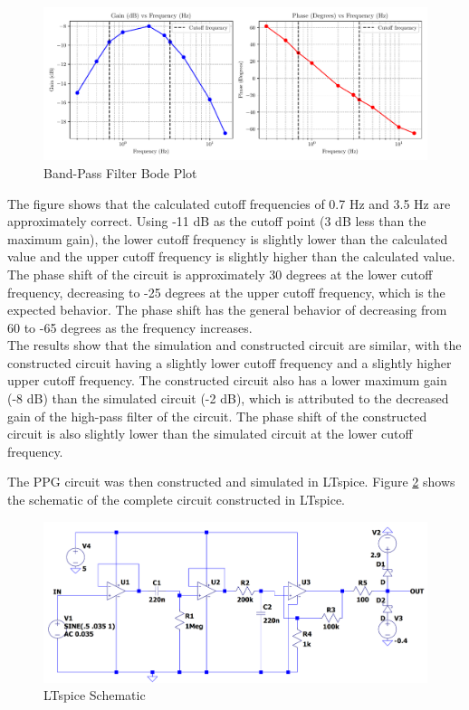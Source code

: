 \documentclass[CMPE]{KGCOEReport}
\begin{document}
\begin{figure}[H]
    \centering
    \includegraphics[width=1\textwidth]{band_pass_plot.pdf}
    \caption{Band-Pass Filter Bode Plot}
    \label{fig:bandPassBode}
\end{figure}

The figure shows that the calculated cutoff frequencies of 0.7 Hz and 3.5 Hz are approximately correct. Using -11 dB as the cutoff point (3 dB less than the maximum gain), the lower cutoff frequency is slightly lower than the calculated value and the upper cutoff frequency is slightly higher than the calculated value. The phase shift of the circuit is approximately 30 degrees at the lower cutoff frequency, decreasing to -25 degrees at the upper cutoff frequency, which is the expected behavior. The phase shift has the general behavior of decreasing from 60 to -65 degrees as the frequency increases.\\

The results show that the simulation and constructed circuit are similar, with the constructed circuit having a slightly lower cutoff frequency and a slightly higher upper cutoff frequency. The constructed circuit also has a lower maximum gain (-8 dB) than the simulated circuit (-2 dB), which is attributed to the decreased gain of the high-pass filter of the circuit. The phase shift of the constructed circuit is also slightly lower than the simulated circuit at the lower cutoff frequency.

\bigskip

The PPG circuit was then constructed and simulated in LTspice. Figure \ref{fig:ltspiceSchematic} shows the schematic of the complete circuit constructed in LTspice.

\begin{figure}[H]
    \centering
    \includegraphics[width=1\textwidth]{LTspiceSchematic.png}
    \caption{LTspice Schematic}
    \label{fig:ltspiceSchematic}
\end{figure}
\end{document}
